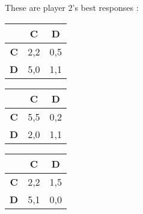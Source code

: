 \documentclass[a4paper]{article}
\begin{document}
These are player 2's best responses :\\
\begin{table}[H]
\begin{tabular}{c|c|c|}
	& \textbf{C} & \textbf{D}\\
	\hline
	\textbf{C} & 2,2 & \cellcolor{red!25} 0,5 \\
	\hline
	\textbf{D} & 5,0 & \cellcolor{red!25} 1,1 \\
\end{tabular}
\hfill
\begin{tabular}{c|c|c|}
	& \textbf{C} & \textbf{D}\\
	\hline
	\textbf{C} & \cellcolor{red!25} 5,5 & 0,2 \\
	\hline
	\textbf{D} & 2,0 & \cellcolor{red!25} 1,1 \\
\end{tabular}
\hfill
\begin{tabular}{c|c|c|}
	& \textbf{C} & \textbf{D}\\
	\hline
	\textbf{C} & 2,2 & \cellcolor{red!25} 1,5 \\
	\hline
	\textbf{D} & \cellcolor{red!25} 5,1 & 0,0 \\
\end{tabular}
\end{table}
\end{document}

